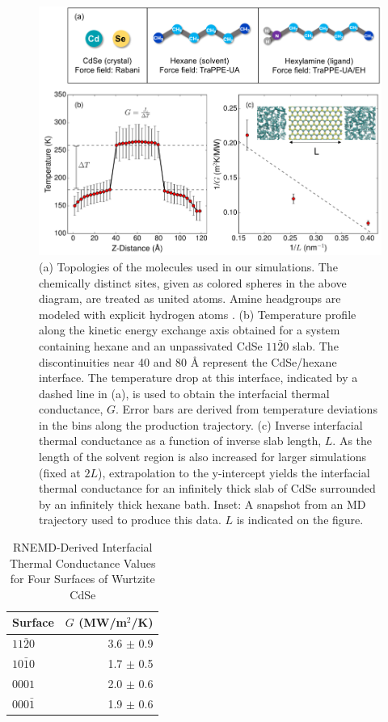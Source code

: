 \begin{figure}
\begin{center}
\includegraphics[width=\textwidth]{./Chapter4/rnemd2.png}
\caption[Details of RNEMD simulations of thermal transport at CdSe/hexane interfaces.]{ (a) Topologies of the molecules used in our simulations. The chemically distinct sites, given as colored spheres in the above diagram, are treated as united atoms. Amine headgroups are modeled with explicit hydrogen atoms \cite{doi:10.1021/jp0504827}. (b) Temperature profile along the kinetic energy exchange axis obtained for a system containing hexane and an unpassivated CdSe $11\bar{2}0$ slab. The discontinuities near 40 and 80 \r{A} represent the CdSe/hexane interface. The temperature drop at this interface, indicated by a dashed line in (a), is used to obtain the interfacial thermal conductance, $G$. Error bars are derived from temperature deviations in the bins along the production trajectory. (c) Inverse interfacial thermal conductance as a function of inverse slab length, $L$. As the length of the solvent region is also increased for larger simulations (fixed at $2L$), extrapolation to the y-intercept yields the interfacial thermal conductance for an infinitely thick slab of CdSe surrounded by an infinitely thick hexane bath. Inset: A snapshot from an MD trajectory used to produce this data. $L$ is indicated on the figure.}
\label{f:rnemd2}
\end{center}
\end{figure}

\begin{table}
\caption{RNEMD-Derived Interfacial Thermal Conductance Values for Four Surfaces of Wurtzite CdSe}
\centering
\begin{tabular}{l r}
\hline\hline
Surface & $G$ (MW/m$^2$/K) \\
\hline
$11\bar{2}0$ & 3.6 $\pm$ 0.9 \\
$10\bar{1}0$ & 1.7 $\pm$ 0.5 \\
$0001$ & 2.0 $\pm$ 0.6 \\
$000\bar{1}$ & 1.9 $\pm$ 0.6 \\
\hline
\end{tabular}
\label{table:rnemdT1}
\end{table}

